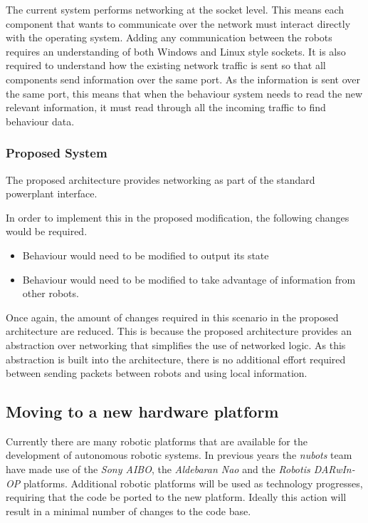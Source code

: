 \documentclass[english,12pt]{scrartcl}
\begin{document}
				The current system performs networking at the socket level.
				This means each component that wants to communicate over the network must interact directly with the operating system.
				Adding any communication between the robots requires an understanding of both Windows and Linux style sockets.
				It is also required to understand how the existing network traffic is sent so that all components send information over the same port.
				As the information is sent over the same port, this means that when the behaviour system needs to read the new relevant information, it must read through all the incoming traffic to find behaviour data.
				
			\subsubsection{Proposed System}
				The proposed architecture provides networking as part of the standard \gls{powerplant} interface.
				
				In order to implement this in the proposed modification, the following changes would be required.
				
				\begin{itemize}
					\item Behaviour would need to be modified to output its state
					\item Behaviour would need to be modified to take advantage of information from other robots.
				\end{itemize}
				
				Once again, the amount of changes required in this scenario in the proposed architecture are reduced.
				This is because the proposed architecture provides an abstraction over networking that simplifies the use of networked logic.
				As this abstraction is built into the architecture, there is no additional effort required between sending packets between robots and using local information.
				
		\subsection{Moving to a new hardware platform}
			Currently there are many robotic platforms that are available for the development of autonomous
			robotic systems. In previous years the \emph{\gls{nubots}} team have made use of the \emph{Sony AIBO},
			the \emph{Aldebaran Nao} and the \emph{Robotis DARwIn-OP} platforms. Additional robotic platforms will be used as technology progresses, requiring that the code be ported to the new platform.
			Ideally this action will result in a minimal number of changes to the code base.
\end{document}
